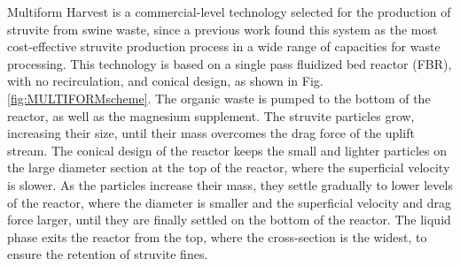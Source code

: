 \begin{refsection}[referencesCh6]
Multiform Harvest is a commercial-level technology selected for the production of struvite from swine waste, since a previous work \citep{martin2021geospatial} found this system as the most cost-effective struvite production process in a wide range of capacities for waste processing.
This technology is based on a single pass fluidized bed reactor (FBR), with no recirculation, and conical design, as shown in Fig. \ref{fig:MULTIFORMscheme}. The organic waste is pumped to the bottom of the reactor, as well as the magnesium supplement. The struvite particles grow, increasing their size, until their mass overcomes the drag force of the uplift stream.  
The conical design of the reactor keeps the small and lighter particles on the large diameter section at the top of the reactor, where the superficial velocity is slower. As the particles increase their mass, they settle gradually to lower levels of the reactor, where the diameter is smaller and the superficial velocity and drag force larger, until they are finally settled on the bottom of the reactor. The liquid phase exits the reactor from the top, where the cross-section is the widest, to ensure the retention of struvite fines.


%
%
%


\end{refsection}
